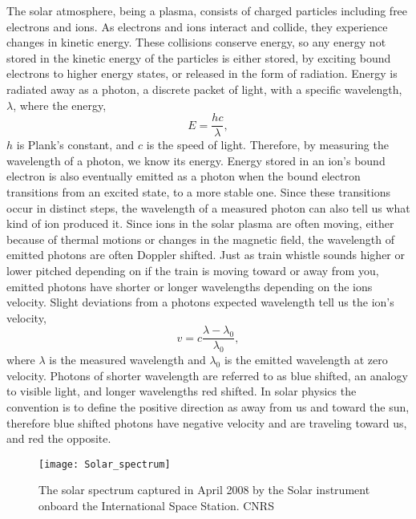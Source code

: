 The solar atmosphere, being a plasma, consists of charged particles including free electrons and ions.
As electrons and ions interact and collide, they experience changes in kinetic energy. 
These collisions conserve energy, so any energy not stored in the kinetic energy of the particles is either stored, by exciting bound electrons to higher energy states, or released in the form of radiation.
Energy is radiated away as a photon, a discrete packet of light, with a specific wavelength, $\lambda$, where the energy,
\begin{equation}
	E = \frac{hc}{\lambda},
\end{equation}
$h$ is Plank's constant, and $c$ is the speed of light.
Therefore, by measuring the wavelength of a photon, we know its energy.
Energy stored in an ion's bound electron is also eventually emitted as a photon when the bound electron transitions from an excited state, to a more stable one.
Since these transitions occur in distinct steps, the wavelength of a measured photon can also tell us what kind of ion produced it.
Since ions in the solar plasma are often moving, either because of thermal motions or changes in the magnetic field, the wavelength of emitted photons are often Doppler shifted.  
Just as train whistle sounds higher or lower pitched depending on if the train is moving toward or away from you, emitted photons have shorter or longer wavelengths depending on the ions velocity.
Slight deviations from a photons expected wavelength tell us the ion's velocity,
\begin{equation}
	v = c \frac{\lambda - \lambda_0}{\lambda_0},
\end{equation}
where $\lambda$ is the measured wavelength and $\lambda_0$ is the emitted wavelength at zero velocity.
Photons of shorter wavelength are referred to as blue shifted, an analogy to visible light, and longer wavelengths red shifted.
In solar physics the convention is to define the positive direction as away from us and toward the sun, therefore blue shifted photons have negative velocity and are traveling toward us, and red the opposite.

\begin{figure}
	\texttt{[image: Solar\_spectrum]}
	\caption{The solar spectrum captured in April 2008 by the Solar instrument onboard the International Space Station. \textcopyright CNRS}
	\label{fig:solar_spec}
\end{figure}

